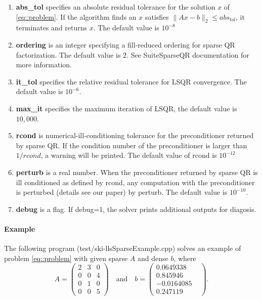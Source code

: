 \documentclass[english,11pt]{article}
\begin{document}
\begin{itemize}
\begin{enumerate}
			\item {\bf abs_tol} specifies an absolute residual tolerance for the solution $x$ of \ref{eq::problem}. If the algorithm finds an $x$ satisfies $\|Ax-b\|_2 \leq abs_{tol}$, it terminates and returns $x$. The default value is $10^{-8}$

			\item {\bf ordering} is an integer specifying a fill-reduced ordering for sparse QR factorization. The default value is 2. See SuiteSparseQR documentation for more information. 

			\item {\bf it_tol} specifies the relative residual tolerance for LSQR convergence. The default value is $10^{-6}$.
			

			\item {\bf max_it} specifies the maximum iteration of LSQR, the default value is $10,000$. 

			\item {\bf rcond} is numerical-ill-conditioning tolerance for the preconditioner returned by sparse QR. If the condition number of the preconditioner is larger than $1/rcond$, a warning will be printed. The default value of rcond is $10^{-12}$

			\item {\bf perturb} is a real number. When the preconditioner returned by sparse QR is ill conditioned as defined by rcond, any computation with the preconditioner is perturbed (details see our paper) by perturb. The default value is $10^{-10}$. 

			\item {\bf debug} is a flag. If debug=1, the solver prints additional outputs for diagosis. 
		\end{enumerate}
		

	\end{itemize}

\paragraph{Example}

The following program (test/ski-llsSparseExample.cpp) solves an example of problem \eqref{eq::problem} with given sparse $A$ and dense $b$, where 
\begin{equation}
A = \begin{pmatrix}
     2     & 3     & 0\\
     0     & 0     & 4\\
     0     & 1     & 0\\
     0     & 0     & 5
\end{pmatrix} \quad \text{and} \quad 
b = \begin{pmatrix}
0.0649338 \\
0.845946 \\
-0.0164085\\
0.247119 & 
\end{pmatrix}.
\end{equation}
\end{document}
